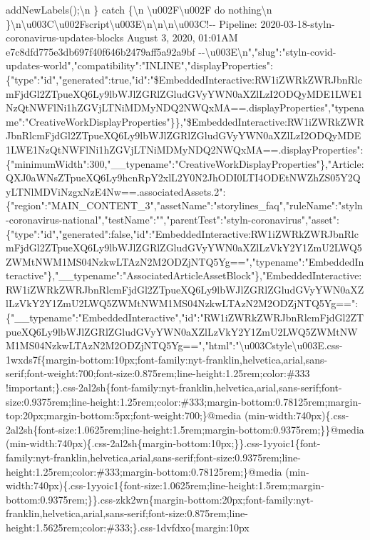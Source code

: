 addNewLabels();\textbackslash{}n \} catch \{\textbackslash{}n
\textbackslash{}u002F\textbackslash{}u002F do nothing\textbackslash{}n
\}\textbackslash{}n\textbackslash{}u003C\textbackslash{}u002Fscript\textbackslash{}u003E\textbackslash{}n\textbackslash{}n\textbackslash{}n\textbackslash{}u003C!-\/-
Pipeline: 2020-03-18-styln-coronavirus-updates-blocks \textbar{} August
3, 2020, 01:01AM \textbar{} e7c8dfd775e3db697f40f646b2479aff5a92a9bf
-\/-\textbackslash{}u003E\textbackslash{}n","slug":"styln-covid-updates-world","compatibility":"INLINE","displayProperties":\{"type":"id","generated":true,"id":"\$EmbeddedInteractive:RW1iZWRkZWRJbnRlcmFjdGl2ZTpueXQ6Ly9lbWJlZGRlZGludGVyYWN0aXZlLzI2ODQyMDE1LWE1NzQtNWFlNi1hZGVjLTNiMDMyNDQ2NWQxMA==.displayProperties","typename":"CreativeWorkDisplayProperties"\}\},"\$EmbeddedInteractive:RW1iZWRkZWRJbnRlcmFjdGl2ZTpueXQ6Ly9lbWJlZGRlZGludGVyYWN0aXZlLzI2ODQyMDE1LWE1NzQtNWFlNi1hZGVjLTNiMDMyNDQ2NWQxMA==.displayProperties":\{"minimumWidth":300,"\_\_typename":"CreativeWorkDisplayProperties"\},"Article:QXJ0aWNsZTpueXQ6Ly9hcnRpY2xlL2Y0N2JhODI0LTI4ODEtNWZhZS05Y2QyLTNlMDViNzgxNzE4Nw==.associatedAssets.2":\{"region":"MAIN\_CONTENT\_3","assetName":"storylines\_faq","ruleName":"styln-coronavirus-national","testName":"","parentTest":"styln-coronavirus","asset":\{"type":"id","generated":false,"id":"EmbeddedInteractive:RW1iZWRkZWRJbnRlcmFjdGl2ZTpueXQ6Ly9lbWJlZGRlZGludGVyYWN0aXZlLzVkY2Y1ZmU2LWQ5ZWMtNWM1MS04NzkwLTAzN2M2ODZjNTQ5Yg==","typename":"EmbeddedInteractive"\},"\_\_typename":"AssociatedArticleAssetBlock"\},"EmbeddedInteractive:RW1iZWRkZWRJbnRlcmFjdGl2ZTpueXQ6Ly9lbWJlZGRlZGludGVyYWN0aXZlLzVkY2Y1ZmU2LWQ5ZWMtNWM1MS04NzkwLTAzN2M2ODZjNTQ5Yg==":\{"\_\_typename":"EmbeddedInteractive","id":"RW1iZWRkZWRJbnRlcmFjdGl2ZTpueXQ6Ly9lbWJlZGRlZGludGVyYWN0aXZlLzVkY2Y1ZmU2LWQ5ZWMtNWM1MS04NzkwLTAzN2M2ODZjNTQ5Yg==","html":"\textbackslash{}u003Cstyle\textbackslash{}u003E.css-1wxds7f\{margin-bottom:10px;font-family:nyt-franklin,helvetica,arial,sans-serif;font-weight:700;font-size:0.875rem;line-height:1.25rem;color:\#333
!important;\}.css-2al2sh\{font-family:nyt-franklin,helvetica,arial,sans-serif;font-size:0.9375rem;line-height:1.25rem;color:\#333;margin-bottom:0.78125rem;margin-top:20px;margin-bottom:5px;font-weight:700;\}@media
(min-width:740px)\{.css-2al2sh\{font-size:1.0625rem;line-height:1.5rem;margin-bottom:0.9375rem;\}\}@media
(min-width:740px)\{.css-2al2sh\{margin-bottom:10px;\}\}.css-1yyoic1\{font-family:nyt-franklin,helvetica,arial,sans-serif;font-size:0.9375rem;line-height:1.25rem;color:\#333;margin-bottom:0.78125rem;\}@media
(min-width:740px)\{.css-1yyoic1\{font-size:1.0625rem;line-height:1.5rem;margin-bottom:0.9375rem;\}\}.css-zkk2wn\{margin-bottom:20px;font-family:nyt-franklin,helvetica,arial,sans-serif;font-size:0.875rem;line-height:1.5625rem;color:\#333;\}.css-1dvfdxo\{margin:10px
